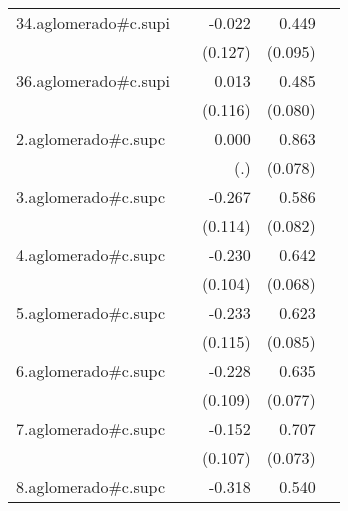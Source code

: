 {\begin{longtable}{l*{4}{D{.}{.}{-1}}}
\addlinespace
34.aglomerado#c.supi&                     &      -0.022         &       0.449\sym{***}&                     \\
            &                     &     (0.127)         &     (0.095)         &                     \\
\addlinespace
36.aglomerado#c.supi&                     &       0.013         &       0.485\sym{***}&                     \\
            &                     &     (0.116)         &     (0.080)         &                     \\
\addlinespace
2.aglomerado#c.supc&                     &       0.000         &       0.863\sym{***}&                     \\
            &                     &         (.)         &     (0.078)         &                     \\
\addlinespace
3.aglomerado#c.supc&                     &      -0.267\sym{*}  &       0.586\sym{***}&                     \\
            &                     &     (0.114)         &     (0.082)         &                     \\
\addlinespace
4.aglomerado#c.supc&                     &      -0.230\sym{*}  &       0.642\sym{***}&                     \\
            &                     &     (0.104)         &     (0.068)         &                     \\
\addlinespace
5.aglomerado#c.supc&                     &      -0.233\sym{*}  &       0.623\sym{***}&                     \\
            &                     &     (0.115)         &     (0.085)         &                     \\
\addlinespace
6.aglomerado#c.supc&                     &      -0.228\sym{*}  &       0.635\sym{***}&                     \\
            &                     &     (0.109)         &     (0.077)         &                     \\
\addlinespace
7.aglomerado#c.supc&                     &      -0.152         &       0.707\sym{***}&                     \\
            &                     &     (0.107)         &     (0.073)         &                     \\
\addlinespace
8.aglomerado#c.supc&                     &      -0.318\sym{**} &       0.540\sym{***}&                     \\

\end{longtable}}
